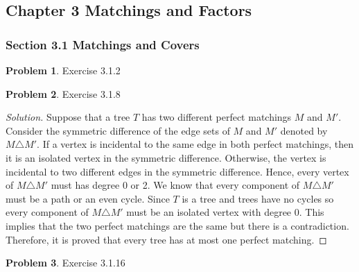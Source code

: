 \documentclass[12pt]{article}
\theoremstyle{definition}
\newtheorem{problem}{Problem}
\newenvironment*{solution}{\begin{proof}[Solution]}{\end{proof}}
\begin{document}
\subsection*{Chapter 3 Matchings and Factors}
\subsubsection*{Section 3.1 Matchings and Covers}
\begin{problem}
    Exercise 3.1.2
\end{problem}
\begin{problem}
    Exercise 3.1.8
\end{problem}
\begin{solution}
    Suppose that a tree \(T\) has two different perfect matchings \(M\) and
    \(M'\). Consider the symmetric difference of the edge sets of \(M\) and
    \(M'\) denoted by \(M\triangle M'\). If a vertex is incidental to the same
    edge in both perfect matchings, then it is an isolated vertex in the
    symmetric difference. Otherwise, the vertex is incidental to two different
    edges in the symmetric difference. Hence, every vertex of
    \(M\triangle M'\) must has degree 0 or 2. We know that every component of
    \(M\triangle M'\) must be a path or an even cycle. Since \(T\) is a tree
    and trees have no cycles so every component of \(M\triangle M'\) must be
    an isolated vertex with degree 0. This implies that the two perfect
    matchings are the same but there is a contradiction. Therefore, it is
    proved that every tree has at most one perfect matching.
\end{solution}
\begin{problem}
    Exercise 3.1.16
\end{problem}
\end{document}
